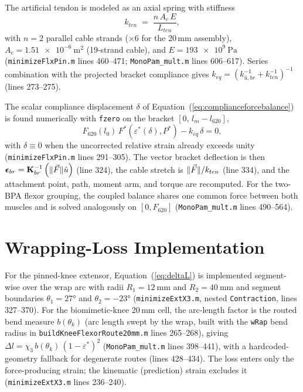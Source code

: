 The artificial tendon is modeled as an axial spring with stiffness
\begin{equation}
    k_{ten} \;=\; \frac{n\,A_{c}\,E}{L_{ten}},
    \label{eq:app_tendon}
\end{equation}
with $n=2$ parallel cable strands ($\times 6$ for the 20\,mm assembly), $A_{c} = \qty{1.51e-6}{\metre\squared}$ (19-strand cable), and $E = \qty{193e9}{\pascal}$ (\texttt{minimizeFlxPin.m} lines 460--471; \texttt{MonoPam\_mult.m} lines 606--617). Series combination with the projected bracket compliance gives $k_{eq} = \left(k_{\hat{u},br}^{-1} + k_{ten}^{-1}\right)^{-1}$ (lines 273--275).

The scalar compliance displacement $\delta$ of Equation~(\ref{eq:complianceforcebalance}) is found numerically with \texttt{fzero} on the bracket $[0,\, l_{m}-l_{620}]$,
\begin{equation}
    F_{620}(l_{0})\,F^{*}\!\left(\varepsilon^{*}(\delta),P^{*}\right) - k_{eq}\,\delta = 0,
    \label{eq:app_forcebalance}
\end{equation}
with $\delta \equiv 0$ when the uncorrected relative strain already exceeds unity (\texttt{minimizeFlxPin.m} lines 291--305). The vector bracket deflection is then $\boldsymbol{\epsilon}_{br} = \mathbf{K}_{br}^{-1}\left(\lVert\vec{F}\rVert\hat{u}\right)$ (line 324), the cable stretch is $\lVert\vec{F}\rVert/k_{ten}$ (line 334), and the attachment point, path, moment arm, and torque are recomputed. For the two-BPA flexor grouping, the coupled balance shares one common force between both muscles and is solved analogously on $[0, F_{620}]$ (\texttt{MonoPam\_mult.m} lines 490--564).

\section{Wrapping-Loss Implementation}

For the pinned-knee extensor, Equation~(\ref{eq:deltaL}) is implemented segment-wise over the wrap arc with radii $R_1 = \qty{12}{\mm}$ and $R_2 = \qty{40}{\mm}$ and segment boundaries $\theta_{1} = \ang{27}$ and $\theta_{2} = \ang{-23}$ (\texttt{minimizeExtX3.m}, nested \texttt{Contraction}, lines 327--370). For the biomimetic-knee 20\,mm cell, the arc-length factor is the routed bend measure $b(\theta_{k})$ (arc length swept by the wrap, built with the \texttt{wRap} bend radius in \texttt{buildKneeFlexorRoute20mm.m} lines 265--268), giving $\Delta l = \chi_{3}\, b(\theta_{k})\,(1-\varepsilon^{*})^{2}$ (\texttt{MonoPam\_mult.m} lines 398--441), with a hardcoded-geometry fallback for degenerate routes (lines 428--434). The loss enters only the force-producing strain; the kinematic (prediction) strain excludes it (\texttt{minimizeExtX3.m} lines 236--240).
